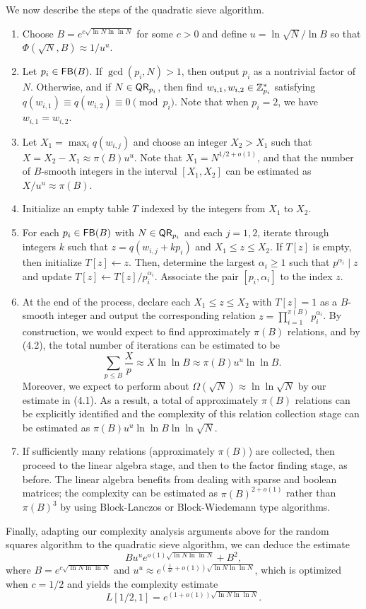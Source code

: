 We now describe the steps of the quadratic sieve algorithm. 
\begin{enumerate}
    \item Choose $B = e^{c\sqrt{\ln N \ln\ln N}}$ for some $c > 0$ and define 
    $u = \ln\sqrt N / \ln B$ so that $\Phi(\sqrt N, B) \approx 1/u^u$. 
    \item Let $p_i \in {\sf FB}(B)$. If $\gcd(p_i, N) > 1$, then output $p_i$ 
    as a nontrivial factor of $N$. Otherwise, and if $N \in {\sf QR}_{p_i}$, then 
    find $w_{i,1}, w_{i,2} \in \mathbb{Z}_{p_i}^*$ satisfying $q(w_{i,1}) \equiv 
    q(w_{i,2}) \equiv 0 \pmod{p_i}$. Note that when $p_i = 2$, we have 
    $w_{i,1} = w_{i,2}$. 
    \item Let $X_1 = \max_i q(w_{i,j})$ and choose an integer $X_2 > X_1$ such that 
    $X = X_2 - X_1 \approx \pi(B) u^u$. Note that $X_1 = N^{1/2 + o(1)}$, and that 
    the number of $B$-smooth integers in the interval $[X_1, X_2]$ can be estimated 
    as $X/u^u \approx \pi(B)$. 
    \item Initialize an empty table $T$ indexed by the integers from $X_1$ to $X_2$. 
    \item For each $p_i \in {\sf FB}(B)$ with $N \in {\sf QR}_{p_i}$ and each $j = 1,2$, 
    iterate through integers $k$ such that $z = q(w_{i,j} + kp_i)$ and $X_1 
    \leq z \leq X_2$. If $T[z]$ is empty, then initialize $T[z] \gets z$. Then, 
    determine the largest $\alpha_i \geq 1$ such that $p^{\alpha_i} \mid z$ 
    and update $T[z] \gets T[z]/p_i^{\alpha_i}$. Associate the pair $[p_i, \alpha_i]$
    to the index $z$. 
    \item At the end of the process, declare each $X_1 \leq z \leq X_2$ with 
    $T[z] = 1$ as a $B$-smooth integer and output the corresponding relation 
    $z = \prod_{i=1}^{\pi(B)} p_i^{\alpha_i}$. By construction, we would expect 
    to find approximately $\pi(B)$ relations, and by (4.2), the total 
    number of iterations can be estimated to be 
    \[ \sum_{p\leq B} \frac{X}{p} \approx X \ln\ln B \approx \pi(B) u^u \ln\ln B. \] 
    Moreover, we expect to perform about $\Omega(\sqrt N) \approx \ln\ln \sqrt N$ 
    by our estimate in (4.1). As a result, a total of approximately $\pi(B)$ 
    relations can be explicitly identified and the complexity of this relation 
    collection stage can be estimated as $\pi(B) u^u \ln\ln B \ln\ln \sqrt N$.
    \item If sufficiently many relations (approximately $\pi(B)$) are collected, 
    then proceed to the linear algebra stage, and then to the factor finding 
    stage, as before. The linear algebra benefits from dealing with sparse 
    and boolean matrices; the complexity can be estimated as $\pi(B)^{2+o(1)}$ 
    rather than $\pi(B)^3$ by using Block-Lanczos or Block-Wiedemann type algorithms. 
\end{enumerate}

Finally, adapting our complexity analysis arguments above for the random squares 
algorithm to the quadratic sieve algorithm, we can deduce the estimate 
\[ Bu^u e^{o(1) \sqrt{\ln N \ln\ln N}} + B^2, \] 
where $B = e^{c\sqrt{\ln N \ln \ln N}}$ and $u^u \approx e^{(\frac{1}{4c} + o(1))
\sqrt{\ln N \ln\ln N}}$, which is optimized when $c = 1/2$ and yields the complexity 
estimate 
\[ L[1/2, 1] = e^{(1+o(1))\sqrt{\ln N \ln\ln N}}. \] 